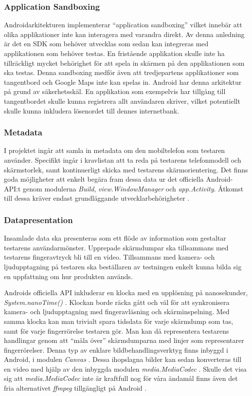 \subsubsection{Application Sandboxing}
\label{subsubsec:sandbox}
Androidarkitekturen implementerar ``application sandboxing'' vilket innebär att olika applikationer inte kan interagera med varandra direkt.\parencite{sandbox} Av denna anledning är det en SDK som behöver utvecklas som sedan kan integreras med applikationen som behöver testas. En fristående applikation skulle inte ha tillräckligt mycket behörighet för att spela in skärmen på den applikationen som ska testas. Denna sandboxing medför även att tredjepartens applikationer som tangentbord och Google Maps inte kan spelas in. 
Android har denna arkitektur på grund av säkerhetsskäl. En applikation som exempelvis har tillgång till tangentbordet skulle kunna registrera allt användaren skriver, vilket potentiellt skulle kunna inkludera lösenordet till dennes internetbank. 

\subsubsection{Metadata}
\label{subsubsec:Metadata}
I projektet ingår att samla in metadata om den mobiltelefon som testaren använder. Specifikt ingår i kravlistan att ta reda på testarens telefonmodell och skärmstorlek, samt kontinuerligt skicka med testarens skärmorientering. Det finns goda möjligheter att enkelt begära fram dessa data ur det officiella Android-API:t genom modulerna \textit{Build}, \textit{view.WindowManager} och \textit{app.Activity}. Åtkomst till dessa kräver endast grundläggande utvecklarbehörigheter \parencite{adoc}.

\subsubsection{Datapresentation}
\label{subsubsec:Datapresentation}
Insamlade data ska presenteras som ett flöde av information som gestaltar testarens användarmönster. Upprepade skärmdumpar ska tillsammans med testarens fingeravtryck bli till en video. Tillsammans med kamera- och ljudupptagning på testaren ska beställaren av testningen enkelt kunna bilda sig en uppfattning om hur produkten används.

Androids officiella API inkluderar en klocka med en upplösning på nanosekunder, \textit{System.nanoTime()} \parencite{adoc}. Klockan borde räcka gått och väl för att synkronisera kamera- och ljudupptagning med fingeravläsning och skärminspelning. Med samma klocka kan man trivialt spara tidsdata för varje skärmdump som tas, samt för varje fingerrörelse testaren gör. Man kan då representera testarens handlingar genom att ``måla över'' skärmdumparna med linjer som representarer fingerrörelser. Denna typ av enklare bildbehandlingsverktyg finns inbyggd i Android, i modulen \textit{Canvas} \parencite{adoc}. Dessa ihopslagna bilder kan sedan konverteras till en video med hjälp av den inbyggda modulen \textit{media.MediaCodec} \parencite{adoc}. Skulle det visa sig att \textit{media.MediaCodec} inte är kraftfull nog för våra ändamål finns även det fria alternativet \textit{ffmpeg} tillgängligt på Android \parencite{roman10}.

